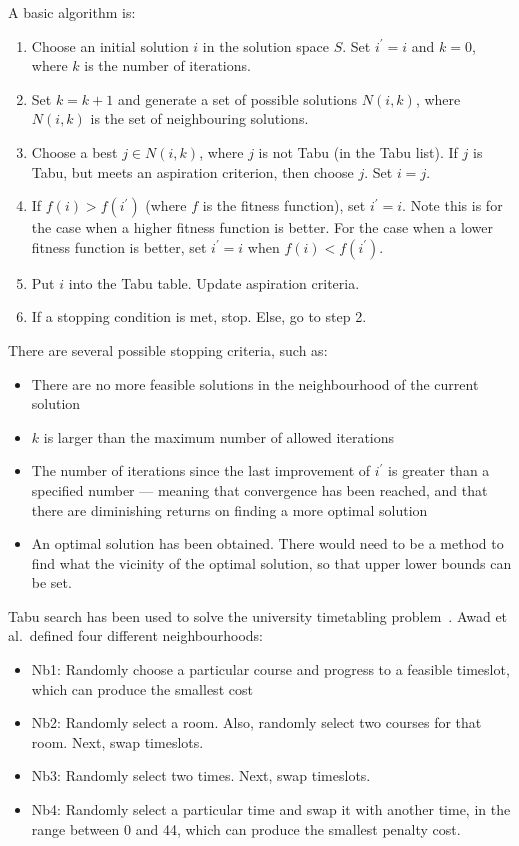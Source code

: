 A basic algorithm is:
\begin{enumerate}
	\item Choose an initial solution \( i \) in the solution space \( S \).
		Set \( i^\prime=i \) and \( k = 0 \), where \( k \) is the number of
		iterations.
	\item Set \( k = k + 1 \) and generate a set of possible solutions
		\( N(i,k) \), where \( N(i,k) \) is the set of neighbouring solutions.
	\item Choose a best \( j \in N(i,k) \), where \( j \) is not Tabu (in the
		Tabu list).
		If \( j \) is Tabu, but meets an aspiration criterion, then choose
		\( j \).
		Set \( i = j \).
	\item If \( f(i) > f(i^\prime) \) (where \( f \) is the fitness function),
		set \( i^\prime = i \).
		Note this is for the case when a higher fitness function is better.
		For the case when a lower fitness function is better, set
		\( i^\prime = i \) when \( f(i) < f(i^\prime) \).
	\item Put \( i \) into the Tabu table. Update aspiration criteria.
	\item If a stopping condition is met, stop. Else, go to step 2.
\end{enumerate}
There are several possible stopping criteria, such as:
\begin{itemize}
	\item There are no more feasible solutions in the neighbourhood of the
		current solution
	\item \( k \) is larger than the maximum number of allowed iterations
	\item The number of iterations since the last improvement of \( i^\prime \)
		is greater than a specified number –-- meaning that convergence has been
		reached, and that there are diminishing returns on finding a more
		optimal solution
	\item An optimal solution has been obtained.
		There would need to be a method to find what the vicinity of the optimal
		solution, so that upper lower bounds can be set.
\end{itemize}
Tabu search has been used to solve the university timetabling
problem~\cite{tabu_example}.
Awad et al.\ defined four different neighbourhoods:
\begin{itemize}
	\item Nb1: Randomly choose a particular course and progress to a feasible
		timeslot, which can produce the smallest cost
	\item Nb2: Randomly select a room. Also, randomly select two courses for
		that room. Next, swap timeslots.
	\item Nb3: Randomly select two times. Next, swap timeslots.
	\item Nb4: Randomly select a particular time and swap it with another time,
		in the range between 0 and 44, which can produce the smallest penalty
		cost.
\end{itemize}
